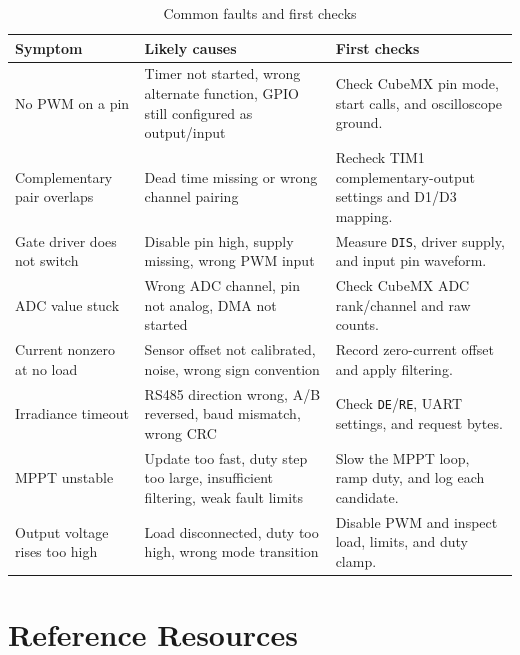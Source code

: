 \documentclass[11pt,a4paper]{article}
\newcommand{\code}[1]{\texttt{#1}}
\let\originalsection\section
\renewcommand{\section}{\clearpage\originalsection}
\begin{document}
\begin{table}[H]
  \centering
  \caption{Common faults and first checks}
  \label{tab:troubleshooting}
  \begin{tabularx}{\textwidth}{@{}L{0.24\textwidth} Y Y@{}}
    \toprule
    \textbf{Symptom} & \textbf{Likely causes} & \textbf{First checks} \\
    \midrule
    No PWM on a pin & Timer not started, wrong alternate function, GPIO still configured as output/input & Check CubeMX pin mode, start calls, and oscilloscope ground. \\
    Complementary pair overlaps & Dead time missing or wrong channel pairing & Recheck TIM1 complementary-output settings and D1/D3 mapping. \\
    Gate driver does not switch & Disable pin high, supply missing, wrong PWM input & Measure \code{DIS}, driver supply, and input pin waveform. \\
    ADC value stuck & Wrong ADC channel, pin not analog, DMA not started & Check CubeMX ADC rank/channel and raw counts. \\
    Current nonzero at no load & Sensor offset not calibrated, noise, wrong sign convention & Record zero-current offset and apply filtering. \\
    Irradiance timeout & RS485 direction wrong, A/B reversed, baud mismatch, wrong CRC & Check \code{DE}/\code{RE}, UART settings, and request bytes. \\
    MPPT unstable & Update too fast, duty step too large, insufficient filtering, weak fault limits & Slow the MPPT loop, ramp duty, and log each candidate. \\
    Output voltage rises too high & Load disconnected, duty too high, wrong mode transition & Disable PWM and inspect load, limits, and duty clamp. \\
    \bottomrule
  \end{tabularx}
\end{table}

\section{Reference Resources}
\label{sec:resources}
\end{document}
